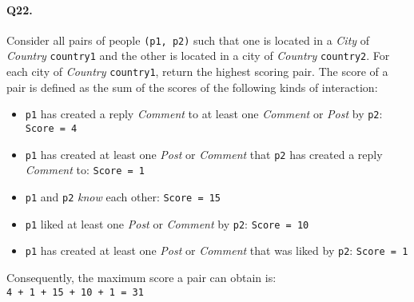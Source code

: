 \paragraph{Q22.}
Consider all pairs of people \texttt{(p1,\ p2)} such that one is located
in a \emph{City} of \emph{Country} \texttt{country1} and the other is
located in a city of \emph{Country} \texttt{country2}.
For each city of \emph{Country} \texttt{country1}, return the highest
scoring pair.
The score of a pair is defined as the sum of the scores of the following
kinds of interaction:
\begin{itemize}
\tightlist
\item
  \texttt{p1} has created a reply \emph{Comment} to at least one
  \emph{Comment} or \emph{Post} by \texttt{p2}: \texttt{Score\ =\ 4}
\item
  \texttt{p1} has created at least one \emph{Post} or \emph{Comment}
  that \texttt{p2} has created a reply \emph{Comment} to:
  \texttt{Score\ =\ 1}
\item
  \texttt{p1} and \texttt{p2} \emph{know} each other:
  \texttt{Score\ =\ 15}
\item
  \texttt{p1} liked at least one \emph{Post} or \emph{Comment} by
  \texttt{p2}: \texttt{Score\ =\ 10}
\item
  \texttt{p1} has created at least one \emph{Post} or \emph{Comment}
  that was liked by \texttt{p2}: \texttt{Score\ =\ 1}
\end{itemize}
Consequently, the maximum score a pair can obtain is:
\texttt{4\ +\ 1\ +\ 15\ +\ 10\ +\ 1\ =\ 31}
